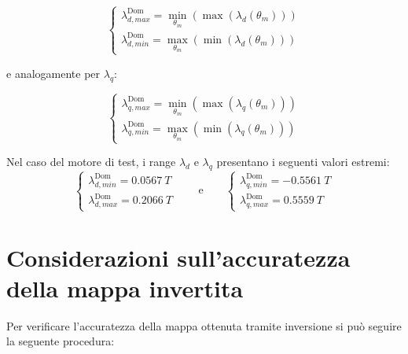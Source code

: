 \begin{equation}
\begin{cases}
    \lambda_{d,max}^\text{Dom}  = \min_{\theta_m} \left( \max(\lambda_{d}(\theta_m)) \right) \\[10pt]
    \lambda_{d,min}^\text{Dom} = \max_{\theta_m} \left( \min(\lambda_{d}(\theta_m)) \right)
\end{cases}
\end{equation}

e analogamente per $\lambda_q$:

\begin{equation}
\begin{cases}
    \lambda_{q,max}^\text{Dom}  = \min_{\theta_m} \left( \max(\lambda_{q}(\theta_m)) \right) \\[10pt]
    \lambda_{q,min}^\text{Dom}  = \max_{\theta_m} \left( \min(\lambda_{q}(\theta_m)) \right)
\end{cases}
\end{equation}

Nel caso del motore di test, i range $\lambda_d$ e $\lambda_q$ presentano i seguenti valori estremi:
\begin{equation}
\begin{cases}
    \lambda_{d,min}^\text{Dom}  =  0.0567\ T \\[10pt]
    \lambda_{d,max}^\text{Dom}  =  0.2066\ T
\end{cases}
\qquad \text{e} \qquad
\begin{cases}
    \lambda_{q,min}^\text{Dom}  =  -0.5561\ T \\[10pt]
    \lambda_{q,max}^\text{Dom}  =  0.5559\ T
\end{cases}
\end{equation}

\section{Considerazioni sull'accuratezza della mappa invertita}
\label{sec:accuratezza_mappa}
Per verificare l'accuratezza della mappa ottenuta tramite inversione si può seguire la seguente procedura:

